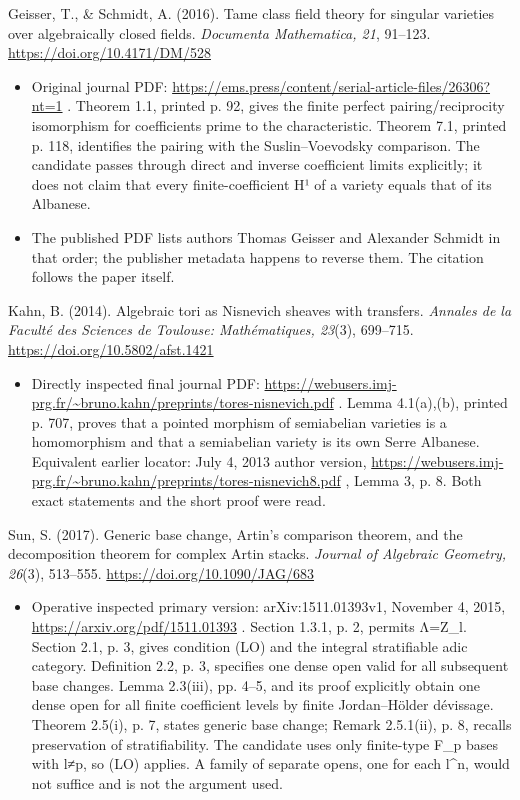 \documentclass[11pt,a4paper]{article}
\providecommand{\tightlist}{\setlength{\itemsep}{0pt}\setlength{\parskip}{0pt}}
\theoremstyle{definition}\newtheorem{definition}[theorem]{Definition}
\theoremstyle{remark}\newtheorem{remark}[theorem]{Remark}
\begin{document}
Geisser, T., \& Schmidt, A. (2016). Tame class field theory for singular
varieties over algebraically closed fields. \emph{Documenta Mathematica,
21}, 91--123. \url{https://doi.org/10.4171/DM/528}

\begin{itemize}
\tightlist
\item
  Original journal PDF:
  \url{https://ems.press/content/serial-article-files/26306?nt=1} .
  Theorem 1.1, printed p. 92, gives the finite perfect
  pairing/reciprocity isomorphism for coefficients prime to the
  characteristic. Theorem 7.1, printed p. 118, identifies the pairing
  with the Suslin--Voevodsky comparison. The candidate passes through
  direct and inverse coefficient limits explicitly; it does not claim
  that every finite-coefficient H¹ of a variety equals that of its
  Albanese.
\item
  The published PDF lists authors Thomas Geisser and Alexander Schmidt
  in that order; the publisher metadata happens to reverse them. The
  citation follows the paper itself.
\end{itemize}

Kahn, B. (2014). Algebraic tori as Nisnevich sheaves with transfers.
\emph{Annales de la Faculté des Sciences de Toulouse: Mathématiques,
23}(3), 699--715. \url{https://doi.org/10.5802/afst.1421}

\begin{itemize}
\tightlist
\item
  Directly inspected final journal PDF:
  \url{https://webusers.imj-prg.fr/~bruno.kahn/preprints/tores-nisnevich.pdf}
  . Lemma 4.1(a),(b), printed p. 707, proves that a pointed morphism of
  semiabelian varieties is a homomorphism and that a semiabelian variety
  is its own Serre Albanese. Equivalent earlier locator: July 4, 2013
  author version,
  \url{https://webusers.imj-prg.fr/~bruno.kahn/preprints/tores-nisnevich8.pdf}
  , Lemma 3, p. 8. Both exact statements and the short proof were read.
\end{itemize}

Sun, S. (2017). Generic base change, Artin's comparison theorem, and the
decomposition theorem for complex Artin stacks. \emph{Journal of
Algebraic Geometry, 26}(3), 513--555.
\url{https://doi.org/10.1090/JAG/683}

\begin{itemize}
\tightlist
\item
  Operative inspected primary version: arXiv:1511.01393v1, November 4,
  2015, \url{https://arxiv.org/pdf/1511.01393} . Section 1.3.1, p. 2,
  permits Λ=Z\_l. Section 2.1, p. 3, gives condition (LO) and the
  integral stratifiable adic category. Definition 2.2, p. 3, specifies
  one dense open valid for all subsequent base changes. Lemma 2.3(iii),
  pp. 4--5, and its proof explicitly obtain one dense open for all
  finite coefficient levels by finite Jordan--Hölder dévissage. Theorem
  2.5(i), p. 7, states generic base change; Remark 2.5.1(ii), p. 8,
  recalls preservation of stratifiability. The candidate uses only
  finite-type F\_p bases with l≠p, so (LO) applies. A family of separate
  opens, one for each l\^{}n, would not suffice and is not the argument
  used.
\end{itemize}
\end{document}

